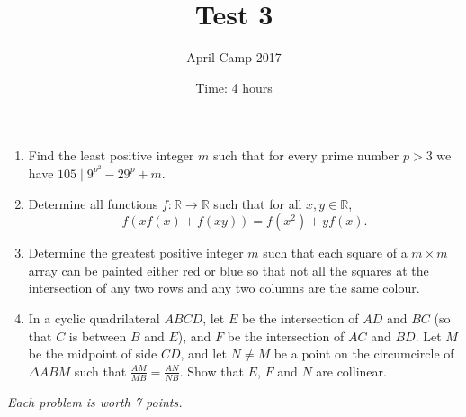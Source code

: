 \documentclass[a4paper,12pt]{article}
\title{Test 3}
\date{Time: 4 hours}
\author{April Camp 2017}
\begin{document}
 \maketitle

\begin{enumerate}
	\item %
	Find the least positive integer $m$ such that for every prime number $p>3$ we have $105 \mid 9^{p^2} -29^p +m$.

	\item 
	Determine all functions $f: \mathbb{R}\to\mathbb{R}$ such that for all $x,y\in\mathbb{R}$, $$f(xf(x)+f(xy)) = f(x^2) +yf(x).$$

	\item %
	Determine the greatest positive integer $m$ such that each square of a $m\times m$ array can be painted either red or blue so that not all the squares at the intersection of any two rows and any two columns are the same colour.
	
	\item %
	In a cyclic quadrilateral $ABCD$, let $E$ be the intersection of $AD$ and $BC$ (so that $C$ is between $B$ and $E$), and $F$ be the intersection of $AC$ and $BD$. Let $M$ be the midpoint of side $CD$, and let $N\neq M$ be a point on the circumcircle of $\Delta ABM$ such that $\frac{AM}{MB}=\frac{AN}{NB}$. Show that $E$, $F$ and $N$ are collinear.

\end{enumerate}

\medskip 

\hfill \emph{Each problem is worth 7 points.}
	
\end{document}
